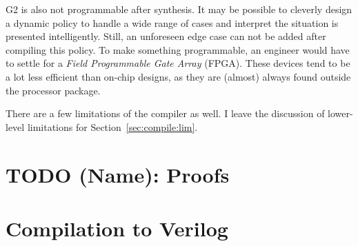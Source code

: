 \documentclass[sigconf,usenames,dvipsnames,svgnames,table]{acmart}
\def \sysname {\textsc{G2}\xspace}
\begin{document}
      \sysname is also not programmable after synthesis.
      It may be possible to cleverly design a dynamic policy to handle a wide range of cases and interpret the situation is presented intelligently.
      Still, an unforeseen edge case can not be added after compiling this policy.
      To make something programmable, an engineer would have to settle for a \textit{Field Programmable Gate Array} (FPGA).
      These devices tend to be a lot less efficient than on-chip designs, as they are (almost) always found outside the processor package.
      \par

      There are a few limitations of the compiler as well.
      I leave the discussion of lower-level limitations for Section~\ref{sec:compile:lim}.


  \section{TODO (Name): Proofs}\label{sec:proofs}







  \section{Compilation to Verilog}\label{sec:comp}
\end{document}
